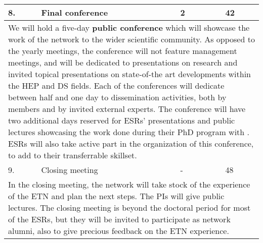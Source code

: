 \begin{center}
{\begin{tabular}{@{}lp{56mm}p{7mm}p{40mm}p{20mm}@{}}
				
				\cellcolor{cyan} 8. & Final conference & 2 & \cnrsentity & 42  \tabularnewline \hline
				
				\multicolumn{5}{p{\textwidth}}{					
				
				We will hold a five-day \textbf{public conference}
				which will showcase the work of the network to the wider scientific community. 
				As opposed to the yearly meetings, the conference will not feature management meetings,
				and will be dedicated to presentations on \acronym research
				and invited topical presentations on state-of-the art developments within the HEP and DS fields. 
				Each of the conferences will dedicate between
				half and one day to dissemination activities, both by \acronym members and by invited external experts. 
				The conference will have two additional days reserved for ESRs' presentations and 
				public lectures showcasing the work done during their PhD program with \acronym. ESRs will also
				take active part in the organization of this conference, to add to their transferrable skillset. 
				} \tabularnewline \hline\midrule
						
				\cellcolor{red!70!black} 9. & Closing meeting & - & \lundentity & 48  \tabularnewline\midrule
				
				\multicolumn{5}{p{\textwidth}}{					
				
				In the closing meeting, the network will take stock of the experience of the ETN and plan the next steps. The PIs will give 
				public lectures. The closing meeting is beyond the doctoral period for most of the ESRs,
				but they will be invited to participate as network alumni, also to give precious feedback on the ETN experience. 

				} \tabularnewline \hline\midrule

				\bottomrule
			\end{tabular}

}%
\end{center}

	


